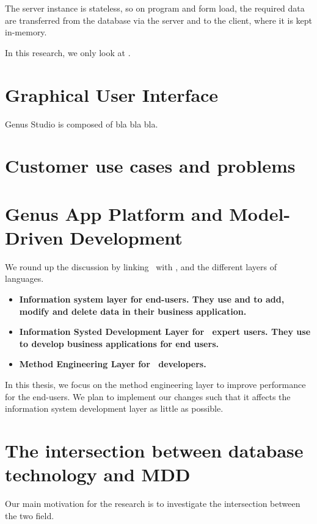 The server instance is stateless, so on program and form load, the required data are transferred from the database via the server and to the client, where it is kept in-memory.

In this research, we only look at .

\section{Graphical User Interface}
\label{sec:Graphical User Interface}
Genus Studio is composed of bla bla bla.

\section{Customer use cases and problems}
\label{sec:Customer use cases and problems}


\section{Genus App Platform and Model-Driven Development}
\label{sec:Genus App Platform and Model-Driven Development}
We round up the discussion by linking \gap~with \mdd, and the different layers of languages.

\begin{itemize}
    \item \bf{Information system layer} for end-users. They use  and  to add, modify and delete data in their business application.
    \item \bf{Information Systed Development Layer} for \gap~expert users. They use  to develop business applications for end users.
    \item \bf{Method Engineering Layer} for \gap~developers. 
\end{itemize}

In this thesis, we focus on the method engineering layer to improve performance for the end-users. We plan to implement our changes such that it affects the information system development layer as little as possible.


\section{The intersection between database technology and MDD}
\label{sec:The intersection between database technology and MDD}
Our main motivation for the research is to investigate the intersection between the two field. 


